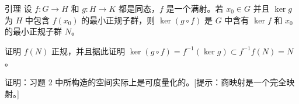 \documentclass[../../main.tex]{subfiles}
\begin{document}
\begin{exercise}\label{exercise:ch11-73-03}
引理 设 $f:G\to H$ 和 $g:H\to K$ 都是同态，$f$ 是一个满射。若 $x_0\in G$ 并且 $\ker g$ 为 $H$ 中包含 $f(x_0)$ 的最小正规子群，则 $\ker(g\circ f)$ 是 $G$ 中含有 $\ker f$ 和 $x_0$ 的最小正规子群 $N$。

证明 $f(N)$ 正规，并且据此证明 $\ker(g\circ f)=f^{-1}(\ker g)\subset f^{-1}f(N)=N$。
\end{exercise}

\begin{exercise}\label{exercise:ch11-73-04}
证明：习题 2 中所构造的空间实际上是可度量化的。[提示：商映射是一个完全映射。]
\end{exercise}
\end{document}
